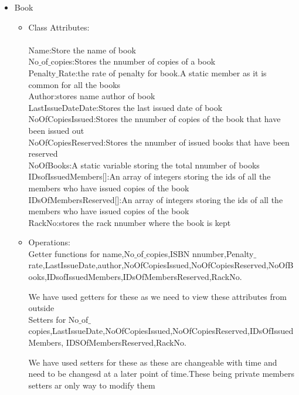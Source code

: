 \documentclass[a4paper]{article}
\begin{document}
 \begin{itemize}
\item Book
\begin{itemize}
\item Class Attributes:\\
\\Name:Store the name of book
\\No$\_$of$\_$copies:Stores the nnumber of copies of a book
\\Penalty$\_$Rate:the rate of penalty for book.A static member as it is common for all the books
\\Author:stores name  author of book 
\\LastIssueDateDate:Stores the last issued date of book
\\NoOfCopiesIssued:Stores the nnumber of copies of the book that have been issued out
\\NoOfCopiesReserved:Stores the nnumber of issued books that have been reserved
\\NoOfBooks:A static variable storing the total nnumber of books
\\IDsofIssuedMembers[]:An array of integers storing the ids of all the members who have issued copies of the book
\\IDsOfMembersReserved[]:An array of integers storing the ids of all the members who have issued copies of the book
\\RackNo:stores the rack nnumber where the book is kept

\item Operations:
\\Getter functions for name,No$\_$of$\_$copies,ISBN nnumber,Penalty$\_$rate,LastIssueDate,author,NoOfCopiesIssued,NoOfCopiesReserved,NoOfBooks,IDsofIssuedMembers,IDsOfMembersReserved,RackNo.

We have used getters for these as we need to view these attributes from outside 
\\
Setters for No$\_$of$\_$copies,LastIssueDate,NoOfCopiesIssued,NoOfCopiesReserved,IDsOfIssuedMembers, IDSOfMembersReserved,RackNo.

We have used setters for these as these are changeable with time and need to be changesd at a later point of time.These being private members setters ar only way to modify them
\end{itemize}



\end{itemize}
\end{document}
